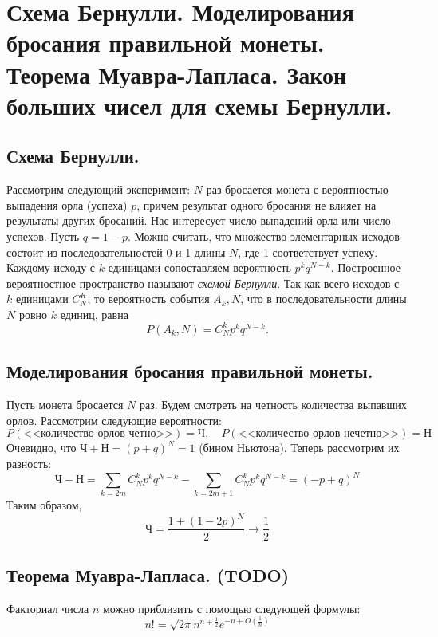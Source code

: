 \section{Схема Бернулли. Моделирования бросания правильной монеты. Теорема Муавра-Лапласа. Закон больших чисел для схемы Бернулли.}

\subsection{Схема Бернулли.}
Рассмотрим следующий эксперимент: $N$ раз бросается монета с вероятностью выпадения орла (успеха) $p$, причем результат одного бросания не влияет на результаты других бросаний. Нас интересует число выпадений орла или число успехов. Пусть $q = 1 - p$.
\newline
Можно считать, что множество элементарных исходов состоит из последовательностей 0 и 1 длины $N$, где 1 соответствует успеху. Каждому исходу с $k$ единицами сопоставляем вероятность $p^k q^{N-k}$. Построенное вероятностное пространство называют \textit{схемой Бернулли}.
\newline
Так как всего исходов с $k$ единицами $C_N^K$, то вероятность события $A_k,N$, что в последовательности длины $N$ ровно $k$ единиц, равна
$$P(A_k, N) = C_N^k p^k q^{N-k}.$$


\subsection{Моделирования бросания правильной монеты.}
Пусть монета бросается $N$ раз. Будем смотреть на четность количества выпавших орлов. Рассмотрим следующие вероятности:
\[
    P(\text{<<количество орлов четно>>}) = \textit{Ч}, \quad P(\text{<<количество орлов нечетно>>}) = \textit{Н}
\]
Очевидно, что $\textit{Ч} + \textit{Н} = (p+q)^N = 1$ (бином Ньютона). Теперь рассмотрим их разность:
\[
    \textit{Ч} - \textit{Н} = \sum_{k = 2m} C_N^k p^k q^{N-k} - \sum_{k = 2m + 1} C_N^k p^k q^{N-k} = (-p + q)^N
\]
Таким образом,
\[
    \textit{Ч} = \frac{1 + (1 - 2p)^N}{2} \longrightarrow \frac{1}{2}
\]

\subsection{Теорема Муавра-Лапласа. (TODO)}
\begin{theorem} Факториал числа $n$ можно приблизить с помощью следующей формулы:
    $$n! = \sqrt{2\pi} n^{n + \frac{1}{2}} e^{-n + O(\frac{1}{n})}$$
\end{theorem}

